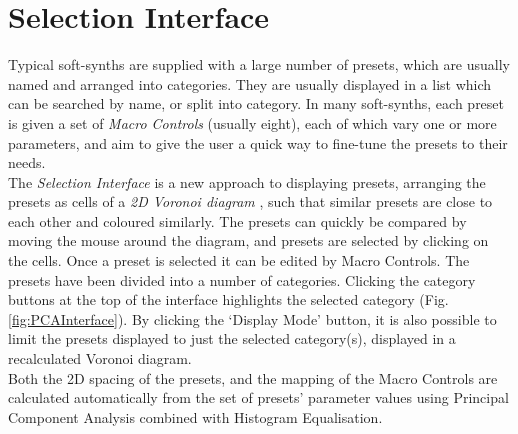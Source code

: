 \documentclass[11pt, oneside]{report}   	%
\begin{document}
\section{Selection Interface}
Typical soft-synths are supplied with a large number of presets, which are usually named and arranged into categories. They are usually displayed in a list which can be searched by name, or split into category. In many soft-synths, each preset is given a set of \emph{Macro Controls} (usually eight), each of which vary one or more parameters, and aim to give the user a quick way to fine-tune the presets to their needs.\\
The \emph{Selection Interface} is a new approach to displaying presets, arranging the presets as cells of a \emph{2D Voronoi diagram} \cite{Voronoi}, such that similar presets are close to each other and coloured similarly. The presets can quickly be compared by moving the mouse around the diagram, and presets are selected by clicking on the cells. Once a preset is selected it can be edited by Macro Controls. 
The presets have been divided into a number of categories. Clicking the category buttons at the top of the interface highlights the selected category (Fig. \ref{fig:PCAInterface}). By clicking the `Display Mode' button, it is also possible to limit the presets displayed to just the selected category(s), displayed in a recalculated Voronoi diagram.\\
Both the 2D spacing of the presets, and the mapping of the Macro Controls are calculated automatically from the set of presets' parameter values using Principal Component Analysis combined with Histogram Equalisation.
\end{document}
